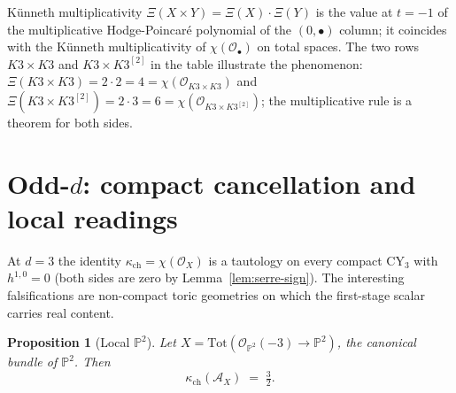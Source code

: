 \documentclass[11pt]{article}
\newtheorem{proposition}[theorem]{Proposition}
\providecommand{\cA}{\mathcal{A}}
\providecommand{\cO}{\mathcal{O}}
\providecommand{\Tot}{\mathrm{Tot}}
\begin{document}
K\"unneth multiplicativity $\Xi(X\times Y)=\Xi(X)\cdot\Xi(Y)$ is the
value at $t=-1$ of the multiplicative Hodge-Poincar\'e polynomial of
the $(0,\bullet)$ column; it coincides with the K\"unneth
multiplicativity of $\chi(\cO_{\bullet})$ on total spaces. The two
rows $K3\times K3$ and $K3\times K3^{[2]}$ in the table illustrate the
phenomenon: $\Xi(K3\times K3)=2\cdot 2=4=\chi(\cO_{K3\times K3})$ and
$\Xi(K3\times K3^{[2]})=2\cdot 3=6=\chi(\cO_{K3\times K3^{[2]}})$; the
multiplicative rule is a theorem for both sides.

\section{Odd-$d$: compact cancellation and local readings}
\label{sec:counterexamples}

At $d=3$ the identity $\kappa_{\mathrm{ch}}=\chi(\cO_X)$ is a tautology
on every compact CY$_3$ with $h^{1,0}=0$ (both sides are zero by
Lemma~\ref{lem:serre-sign}). The interesting falsifications are
non-compact toric geometries on which the first-stage scalar carries
real content.

\begin{proposition}[Local $\mathbb{P}^2$]
\label{prop:local-p2}
Let $X=\Tot(\cO_{\mathbb{P}^2}(-3)\to\mathbb{P}^2)$, the canonical bundle
of $\mathbb{P}^2$. Then
\[
   \kappa_{\mathrm{ch}}(\cA_X)\;=\;\tfrac{3}{2}.
\]
\end{proposition}
\end{document}

